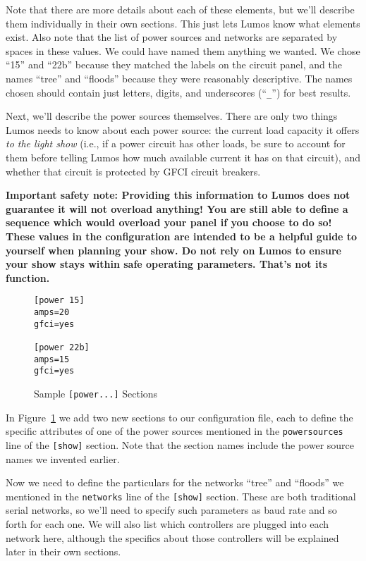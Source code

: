 \documentclass{article}
\begin{document}
Note that there are more details about each of these elements, but we'll
describe them individually in their own sections.  This just lets Lumos know
what elements exist.  Also note that the list of power sources and networks
are separated by spaces in these values.  We could have named them anything we
wanted.  We chose ``15'' and ``22b'' because they matched the labels on the
circuit panel, and the names ``tree'' and ``floods'' because they were
reasonably descriptive.  The names chosen should contain just letters, digits,
and underscores (``\verb+_+'') for best results.

Next, we'll describe the power sources themselves.  There are only two things
Lumos needs to know about each power source: the current load capacity it
offers {\em to the light show\/} (i.e., if a power circuit has other loads, be
sure to account for them before telling Lumos how much available current it
has on that circuit), and whether that circuit is protected by GFCI circuit
breakers.

{\bf Important safety note: Providing this information to Lumos does not
guarantee it will not overload anything!  You are still able to define a
sequence which would overload your panel if you choose to do so!  These values
in the configuration are intended to be a helpful guide to yourself when
planning your show.  Do not rely on Lumos to ensure your show stays within
safe operating parameters.  That's not its function.}

\begin{figure}[htbp]
\begin{verbatim}
[power 15]
amps=20
gfci=yes

[power 22b]
amps=15
gfci=yes
\end{verbatim}
\caption{Sample {\tt[power...]} Sections}
\label{conf:power}
\end{figure}

In Figure~\ref{conf:power} we add two new sections to our configuration file,
each to define the specific attributes of one of the power sources mentioned
in the {\tt powersources} line of the {\tt[show]} section.  Note that the
section names include the power source names we invented earlier.

Now we need to define the particulars for the networks ``tree'' and ``floods''
we mentioned in the {\tt networks} line of the {\tt[show]} section.  These are
both traditional serial networks, so we'll need to specify such parameters as
baud rate and so forth for each one.  We will also list which controllers are
plugged into each network here, although the specifics about those controllers
will be explained later in their own sections.
\end{document}
